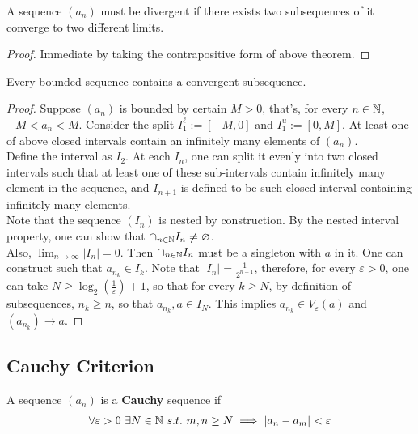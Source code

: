 \documentclass[11pt]{article}
\begin{document}
	\begin{corollary}
		A sequence $(a_n)$ must be divergent if there exists two subsequences of it converge to two different limits.
	\end{corollary}
	
	\begin{proof}
		Immediate by taking the contrapositive form of above theorem.
	\end{proof}
	
	\begin{theorem}
		Every bounded sequence contains a convergent subsequence.
	\end{theorem}
	
	\begin{proof}
		Suppose $(a_n)$ is bounded by certain $M > 0$, that's, for every $n \in \mathbb{N}$, $-M < a_n < M$. Consider the split $I_1^\ell := [-M, 0]$ and $I_1^u := [0, M]$. At least one of above closed intervals contain an infinitely many elements of $(a_n)$.\\
		Define the interval as $I_2$. At each $I_n$, one can split it evenly into two closed intervals such that at least one of these sub-intervals contain infinitely many element in the sequence, and $I_{n+1}$ is defined to be such closed interval containing infinitely many elements.\\
		Note that the sequence $(I_n)$ is nested by construction. By the nested interval property, one can show that $\cap_{n \in \mathbb{N}} I_n \neq \varnothing$.\\
		Also, $\lim_{n \to \infty} |I_n| = 0$. Then $\cap_{n \in \mathbb{N}} I_n$ must be a singleton with $a$ in it. One can construct such that $a_{n_k} \in I_k$. Note that $|I_n| = \frac{1}{2^{n-1}}$, therefore, for every $\varepsilon > 0$, one can take $N \geq \log_2 \left({\frac{1}{\varepsilon}}\right) + 1$, so that for every $k \geq N$, by definition of subsequences, $n_k \geq n$, so that $a_{n_k}, a \in I_N$. This implies $a_{n_k} \in V_{\varepsilon}(a)$ and $(a_{n_k}) \to a$.
	\end{proof}
	
	\subsection{Cauchy Criterion}
	\begin{definition}
		A sequence $(a_n)$ is a \textbf{Cauchy} sequence if
		\begin{align}
			\forall \varepsilon > 0\ \exists N \in \mathbb{N}\ s.t.\ m, n \geq N \implies |a_n - a_m| < \varepsilon
		\end{align}
	\end{definition}
	
\end{document}
